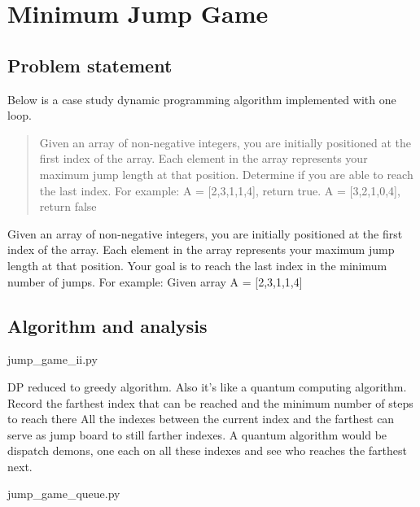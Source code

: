 \chapter{Minimum Jump Game}\label{ch:minimumjumpgame}
\section{Problem statement}\label{sec:problemStatement}

Below is a case study dynamic programming algorithm implemented with one loop.
\begin{quote}
    Given an array of non-negative integers, you are initially positioned at the first index of the array.
    Each element in the array represents your maximum jump length at that position.
    Determine if you are able to reach the last index.
    For example:
    A = [2,3,1,1,4], return true.
    A = [3,2,1,0,4], return false
\end{quote}



Given an array of non-negative integers, you are initially positioned at the first index of
the array.
Each element in the array represents your maximum jump length at that position.
Your goal is to reach the last index in the minimum number of jumps.
For example:
Given array A = [2,3,1,1,4]
\section{Algorithm and analysis}

\begin{clisting}
    
    {jump_game_ii.py}
\end{clisting}

DP reduced to greedy algorithm.
Also it's like a quantum computing algorithm.
Record the farthest index that can be reached and the minimum number of steps to reach there
All the indexes between the current index and the farthest can serve as jump board to
still farther indexes.
A quantum algorithm would be dispatch demons, one each on all these indexes and see who
reaches the farthest next.

\begin{clisting}
    
    {jump_game_queue.py}
\end{clisting}
